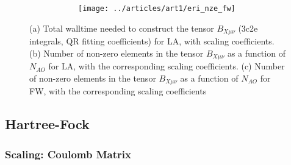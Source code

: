 \begin{figure}
\begin{subfigure}{\textwidth}
\begin{subfigure}{0.45\textwidth}
\centering
\texttt{[image: ../articles/art1/eri\_nze\_fw]}
\end{subfigure}
\hfill
\begin{subtable}{0.45\textwidth}
\centering
{}
\end{subtable}
\caption{}
\label{fig:GS_BNZE_FW}
\end{subfigure}
\caption[Scaling property of $B_{X\mu\nu}$ for LA.]{(a) Total walltime needed to construct the tensor $B_{X\mu\nu}$ (3c2e integrals, QR fitting coefficients) for LA, with scaling coefficients. (b) Number of non-zero elements in the tensor $B_{X\mu\nu}$ as a function of $N_{AO}$ for LA, with the corresponding scaling coefficients. (c) Number of non-zero elements in the tensor $B_{X\mu\nu}$ as a function of $N_{AO}$ for FW, with the corresponding scaling coefficients}
\end{figure}


%
%

\subsection{Hartree-Fock}

\subsubsection{Scaling: Coulomb Matrix}

